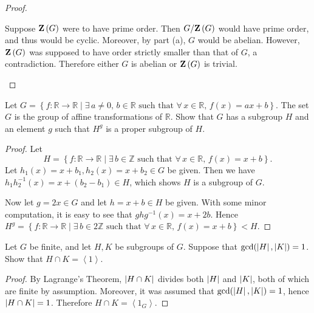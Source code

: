 \documentclass[10pt]{amsart}
\begin{document}
\begin{thm}
\begin{proof}
\begin{enumerate}[(a)]
      Suppose $\mathbf{Z}\left(G\right)$ were to have prime order.
      Then $G/\mathbf{Z}\left(G\right)$ would have prime order, and thus would be cyclic.
      Moreover, by part (a), $G$ would be abelian.
      However, $\mathbf{Z}\left(G\right)$ was supposed to have order strictly smaller than that of $G$, a contradiction.
      Therefore either $G$ is abelian or $\mathbf{Z}\left(G\right)$ is trivial.
      
    \end{enumerate}
  \end{proof}
\end{thm}
\begin{thm}
  Let $G = \left\{f \colon \mathbb{R} \rightarrow \mathbb{R} \mid \exists\, a \not = 0,\, b \in \mathbb{R} \text{ such that } \forall\, x\in \mathbb{R},\, f(x) = ax + b\right\}$.
  The set $G$ is the group of affine transformations of $\mathbb{R}$.  
  Show that $G$ has a subgroup $H$ and an element $g$ such that $H^{g}$ is a proper subgroup of $H$.
  \begin{proof}
    Let 
    $$H = \left\{ f \colon \mathbb{R} \rightarrow \mathbb{R} 
    \mid \exists\, b \in \mathbb{Z} \text{ such that } \forall\, x \in \mathbb{R},\, f(x) = x + b\right\}.$$ 
    Let $h_1(x) = x + b_1, h_2(x) = x + b_2 \in G$ be given.
    Then we have $h_1h_2^{-1}(x) = x + (b_2 - b_1)\in H$, which shows $H$ is a subgroup of $G$.
    
    Now let $g = 2x \in G$ and let $h = x + b \in H$ be given.
    With some minor computation, it is easy to see that $ghg^{-1}(x) = x + 2b$.
    Hence $H^{g} = \left\{ f \colon \mathbb{R} \rightarrow \mathbb{R} \mid \exists\, b \in 2\mathbb{Z} \text{ such that } \forall\, x \in \mathbb{R},\, f(x) = x+b\right\} < H$.
  \end{proof}
\end{thm}
\begin{thm}
  Let $G$ be finite, and let $H, K$ be subgroups of $G$.  Suppose that $\gcd(\left\lvert H \right\rvert, \left\lvert K \right\rvert) = 1$.
  Show that $H \cap K = \left<1\right>$.
  \begin{proof}
    By Lagrange's Theorem, $\left\lvert H \cap K \right\rvert$ divides both $\left\lvert H \right\rvert$ and $\left\lvert K \right\rvert$, both of which are finite by assumption.
    Moreover, it was assumed that $\gcd(\left\lvert H \right\rvert, \left\lvert K \right\rvert) = 1$, hence $\left\lvert H \cap K \right\rvert = 1$.
    Therefore $H \cap K = \left< 1_G\right>$.
  \end{proof}
\end{thm}
\end{document}
